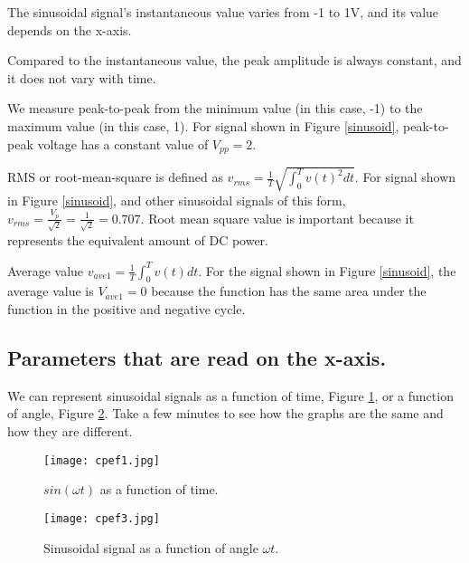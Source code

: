 \documentclass{ximera}
\begin{document}
\begin{definition}
The sinusoidal signal's instantaneous value varies from -1 to 1V, and its value depends on the x-axis. 

Compared to the instantaneous value, the peak amplitude is always constant, and it does not vary with time. 
\end{definition}

\begin{definition}
We measure peak-to-peak from the minimum value  (in this case, -1) to the maximum value (in this case, 1).  For signal shown in Figure \ref{sinusoid}, peak-to-peak voltage has a constant value of  $V_{pp}=2$.
\end{definition}

\begin{definition}
RMS or root-mean-square is defined as $v_{rms}=\frac{1}{T} \sqrt{\int_0^T v(t)^2 dt}$. For signal shown in Figure \ref{sinusoid}, and other sinusoidal signals of this form,  $v_{rms}=\frac{V_p}{\sqrt{2}}=\frac{1}{\sqrt{2}}=0.707$. Root mean square value is important because it represents the equivalent amount of DC power.
\end{definition}


\begin{definition}
Average value $v_{ave1}=\frac{1}{T} \int_0^T v(t) dt$. For the signal shown in Figure \ref{sinusoid}, the average value is $V_{ave1}=0$ because the function has the same area under the function in the positive and negative cycle. 
\end{definition}

\subsection{Parameters that are read on the x-axis.}

\begin{definition}
We can represent sinusoidal signals as a function of time, Figure \ref{sin}, or a function of angle, Figure \ref{sinPh}. Take a few minutes to see how the graphs are the same and how they are different.



\begin{figure}[htpb]
\texttt{[image: cpef1.jpg]}
\caption{$sin ( \omega t)$ as a function of time.} \label{sin}
\end{figure}




\begin{figure}[htpb]
\texttt{[image: cpef3.jpg]}
\caption{Sinusoidal signal as a function of angle $\omega t$.}
\label{sinPh}
\end{figure}

\end{definition}
\end{document}
